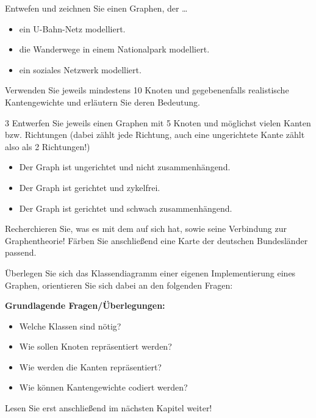 \documentclass{article}
\begin{document}
\begin{task}{2}
    Entwefen und zeichnen Sie einen Graphen, der \dots 
    \begin{itemize}
        \item ein U-Bahn-Netz modelliert. 
        \item die Wanderwege in einem Nationalpark modelliert.
        \item ein soziales Netzwerk modelliert.
    \end{itemize}
    Verwenden Sie jeweils mindestens 10 Knoten und gegebenenfalls realistische Kantengewichte und erläutern Sie deren Bedeutung.
\end{task}

\begin{task} {3}
    Entwerfen Sie jeweils einen Graphen mit 5 Knoten und möglichst vielen Kanten bzw. Richtungen (dabei zählt jede Richtung, auch eine ungerichtete Kante zählt also als 2 Richtungen!)
    \begin{itemize}
        \item Der Graph ist ungerichtet und nicht zusammenhängend.
        \item Der Graph ist gerichtet und zykelfrei.
        \item Der Graph ist gerichtet und schwach zusammenhängend.
    \end{itemize}
\end{task}

\begin{task}{4}
Recherchieren Sie, was es mit dem  auf sich hat, sowie seine Verbindung zur Graphentheorie! Färben Sie anschließend eine Karte der deutschen Bundesländer passend. 
\end{task}

\begin{task}{5} 
    Überlegen Sie sich das Klassendiagramm einer eigenen Implementierung eines Graphen, orientieren Sie sich dabei an den folgenden Fragen: 
    \end{task}
    \textbf{Grundlagende Fragen/Überlegungen:}
    \begin{itemize}
        \item Welche Klassen sind nötig?
        \item Wie sollen Knoten repräsentiert werden?
        \item Wie werden die Kanten repräsentiert?
        \item Wie können Kantengewichte codiert werden?
    \end{itemize}
    Lesen Sie erst anschließend im nächsten Kapitel weiter!
\end{document}
